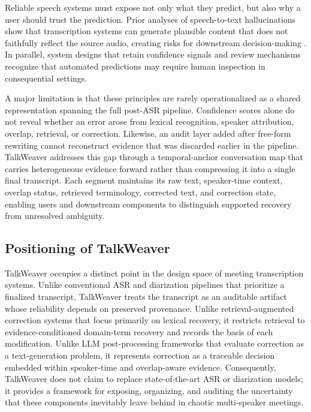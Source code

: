 \documentclass[10pt,twocolumn]{article}
\begin{document}
Reliable speech systems must expose not only what they predict, but also why a user should trust the prediction. Prior analyses of speech-to-text hallucinations show that transcription systems can generate plausible content that does not faithfully reflect the source audio, creating risks for downstream decision-making \cite{koenecke2024careless}. In parallel, system designs that retain confidence signals and review mechanisms recognize that automated predictions may require human inspection in consequential settings.

A major limitation is that these principles are rarely operationalized as a shared representation spanning the full post-ASR pipeline. Confidence scores alone do not reveal whether an error arose from lexical recognition, speaker attribution, overlap, retrieval, or correction. Likewise, an audit layer added after free-form rewriting cannot reconstruct evidence that was discarded earlier in the pipeline. TalkWeaver addresses this gap through a temporal-anchor conversation map that carries heterogeneous evidence forward rather than compressing it into a single final transcript. Each segment maintains its raw text, speaker-time context, overlap status, retrieved terminology, corrected text, and correction state, enabling users and downstream components to distinguish supported recovery from unresolved ambiguity.

\subsection{Positioning of TalkWeaver}

TalkWeaver occupies a distinct point in the design space of meeting transcription systems. Unlike conventional ASR and diarization pipelines that prioritize a finalized transcript, TalkWeaver treats the transcript as an auditable artifact whose reliability depends on preserved provenance. Unlike retrieval-augmented correction systems that focus primarily on lexical recovery, it restricts retrieval to evidence-conditioned domain-term recovery and records the basis of each modification. Unlike LLM post-processing frameworks that evaluate correction as a text-generation problem, it represents correction as a traceable decision embedded within speaker-time and overlap-aware evidence. Consequently, TalkWeaver does not claim to replace state-of-the-art ASR or diarization models; it provides a framework for exposing, organizing, and auditing the uncertainty that these components inevitably leave behind in chaotic multi-speaker meetings.
\end{document}
